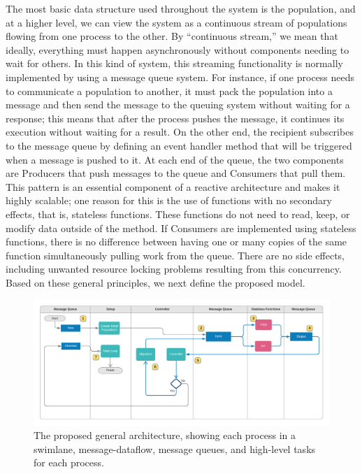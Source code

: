 \documentclass[review]{elsarticle}
\begin{document}
The most basic data structure used throughout the system is the population, and at a higher
level, we can view the system as a continuous stream of populations
flowing from one process to the other. By ``continuous stream,'' we mean that ideally,
everything must happen asynchronously without components needing to wait for
others. In this kind of system, this streaming functionality is normally
implemented by using a message queue system. For instance, if one process needs
to communicate a population to another, it must pack the population into
a message and then send the message 
to the queuing system without waiting for a response; this
means that after the process pushes the message, it continues its execution
without waiting for a result. On the other end, the recipient subscribes to the
message queue by defining an event handler method that will be triggered when a
message is pushed to it. At each end of the queue, the two components are 
Producers that push messages to the queue and Consumers that pull them. This
pattern is an essential component of a reactive architecture and makes
it highly scalable; one reason for this is the use of functions
with no secondary effects, that is,
stateless functions. These functions do not need to read, keep, or modify data outside of the method. If
Consumers are implemented using stateless functions, there is no difference
between having one or many copies of the same function simultaneously pulling work
from the queue. There are no side effects, including unwanted resource
locking problems resulting from this concurrency.
Based on these general principles, we next define the proposed model.


\begin{figure}
    \centering
    \includegraphics[width=\textwidth]{KafkEOsmall}
    \caption{The proposed general architecture, 
     showing each process in a swimlane, message-dataflow,
     message queues, and high-level tasks for each process.} 
    \label{fig:kafkEO}
\end{figure}
\end{document}
